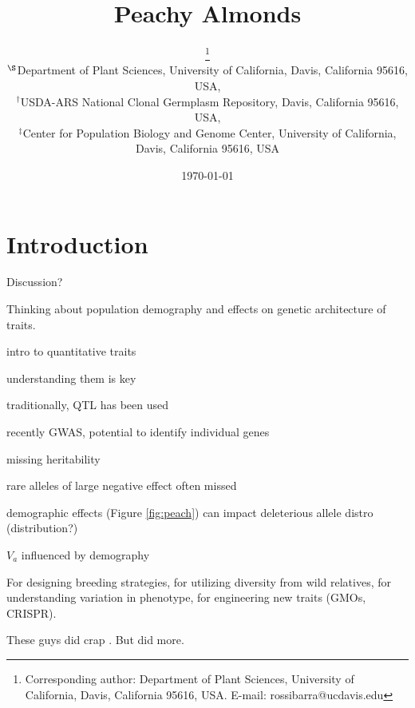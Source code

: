 \documentclass[12pt]{article}
\begin{document}
\title{Peachy Almonds}

\author{\small{}\thanks{Corresponding author: Department of Plant Sciences, University of California, Davis, California 95616, USA. E-mail: \mbox{rossibarra@ucdavis.edu}} \\[0.3cm]
     \small\sf $^{\S}$Department of Plant Sciences, University of California, Davis, California 95616, USA,\\
     \small\sf $^{\dag}$USDA-ARS National Clonal Germplasm Repository, Davis, California 95616, USA,\\
     \small\sf $^{\ddag}$Center for Population Biology and Genome Center, University of California, Davis, California 95616, USA}

\date{\today}

\maketitle

\section*{Introduction}

Discussion?

Thinking about population demography and effects on genetic architecture of traits.

intro to quantitative traits

understanding them is key

traditionally, QTL has been used

recently GWAS, potential to identify individual genes

missing heritability

rare alleles of large negative effect often missed \citep{Thornton2013}


demographic effects (Figure \ref{fig:peach}) can impact deleterious allele distro (distribution?)

$V_a$ influenced by demography \citep{Lohmueller2014}

For designing breeding strategies, for utilizing diversity from wild relatives, for understanding variation in phenotype, for engineering new traits (GMOs, CRISPR).



These guys did crap \citep{Gazave2013}.
But \citet{Thornton2014} did more.
\end{document}
